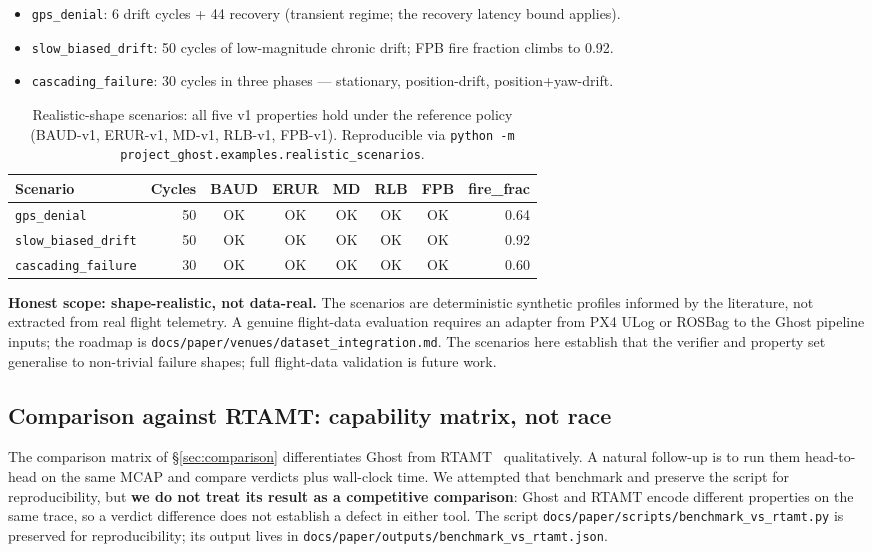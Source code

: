 \documentclass[11pt,a4paper]{article}
\begin{document}
\begin{itemize}[noitemsep,topsep=2pt]
  \item \texttt{gps\_denial}: 6 drift cycles + 44 recovery
        (transient regime; the recovery latency bound applies).
  \item \texttt{slow\_biased\_drift}: 50 cycles of low-magnitude
        chronic drift; FPB fire fraction climbs to 0.92.
  \item \texttt{cascading\_failure}: 30 cycles in three phases —
        stationary, position-drift, position+yaw-drift.
\end{itemize}

\begin{table}[h]
\centering
\small
\begin{tabular}{lrcccccr}
\toprule
\textbf{Scenario} & \textbf{Cycles} & \textbf{BAUD} & \textbf{ERUR} & \textbf{MD} & \textbf{RLB} & \textbf{FPB} & \textbf{fire\_frac} \\
\midrule
\texttt{gps\_denial}         & 50 & OK & OK & OK & OK & OK & 0.64 \\
\texttt{slow\_biased\_drift} & 50 & OK & OK & OK & OK & OK & 0.92 \\
\texttt{cascading\_failure}  & 30 & OK & OK & OK & OK & OK & 0.60 \\
\bottomrule
\end{tabular}
\caption{Realistic-shape scenarios: all five v1 properties hold
under the reference policy (BAUD-v1, ERUR-v1, MD-v1, RLB-v1,
FPB-v1). Reproducible via
\texttt{python -m project\_ghost.examples.realistic\_scenarios}.}
\label{tab:realistic}
\end{table}

\textbf{Honest scope: shape-realistic, not data-real.} The
scenarios are deterministic synthetic profiles informed by the
literature, not extracted from real flight telemetry. A genuine
flight-data evaluation requires an adapter from PX4 ULog or
ROSBag to the Ghost pipeline inputs; the roadmap is
\texttt{docs/paper/venues/dataset\_integration.md}. The scenarios
here establish that the verifier and property set generalise to
non-trivial failure shapes; full flight-data validation is future
work.

\subsection{Comparison against RTAMT: capability matrix, not race}
\label{sec:rtamt-bench}

The comparison matrix of \S\ref{sec:comparison} differentiates
Ghost from RTAMT~\cite{nikovic2020rtamt} qualitatively. A natural
follow-up is to run them head-to-head on the same MCAP and compare
verdicts plus wall-clock time. We attempted that benchmark and
preserve the script for reproducibility, but \textbf{we do not
treat its result as a competitive comparison}: Ghost and RTAMT
encode different properties on the same trace, so a verdict
difference does not establish a defect in either tool. The script
\texttt{docs/paper/scripts/benchmark\_vs\_rtamt.py} is preserved
for reproducibility; its output lives in
\texttt{docs/paper/outputs/benchmark\_vs\_rtamt.json}.
\end{document}

